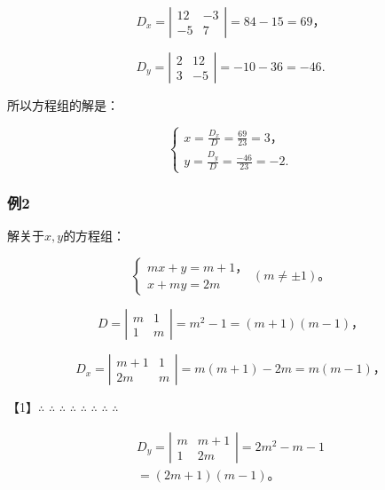 \[
D _ {x} = \left| \begin{array}{cc} 12 & - 3 \\ - 5 & 7 \end{array} \right| = 84 - 15 = 69\text{，}
\]

\[
D _ {y} = \left| \begin{array}{cc} 2 & 12 \\ 3 & - 5 \end{array} \right| = - 10 - 36 = - 46.
\]

所以方程组的解是：

\[
\left\{ \begin{array}{l} x = \frac{D _ {x}}{D} = \frac{69}{23} = 3\text{，} \\ y = \frac{D _ {y}}{D} = \frac{- 46}{23} = - 2. \end{array} \right.
\]

\subsubsection{例2}

解关于\(x, y\)的方程组：

\[
\left\{ \begin{array}{l} m x + y = m + 1\text{，} \\ x + m y = 2 m \end{array} \right. (m \neq \pm 1)\text{。}
\]


\[
D = \left| \begin{array}{cc} m & 1 \\ 1 & m \end{array} \right| = m ^ {2} - 1 = (m + 1) (m - 1)\text{，}
\]

\[
D _ {x} = \left| \begin{array}{cc} m + 1 & 1 \\ 2 m & m \end{array} \right| = m (m + 1) - 2 m = m (m - 1)\text{，}
\]

【1】\(\therefore\) \(\therefore\) \(\therefore\) \(\therefore\) \(\therefore\) \(\therefore\) \(\therefore\) \(\therefore\)

\[
\begin{array}{l} D _ {y} = \left| \begin{array}{cc} m & m + 1 \\ 1 & 2 m \end{array} \right| = 2 m ^ {2} - m - 1 \\ = (2 m + 1) (m - 1)\text{。} \\ \end{array}
\]

